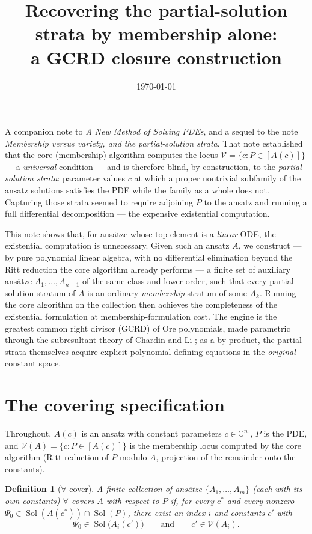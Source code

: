 \documentclass[11pt]{article}
\title{Recovering the partial-solution strata by membership alone:\\
       a GCRD closure construction}
\author{}
\date{\today}
\newcommand{\Var}{\mathcal{V}}
\DeclareMathOperator{\Sol}{Sol}
\newtheorem{definition}{Definition}
\begin{document}
\maketitle

\noindent
A companion note to \emph{A New Method of Solving PDEs}, and a sequel to the
note \emph{Membership versus variety, and the partial-solution strata}. That
note established that the core (membership) algorithm computes the locus
$\Var = \{c : P \in [A(c)]\}$ --- a \emph{universal} condition --- and is
therefore blind, by construction, to the \emph{partial-solution strata}:
parameter values $c$ at which a proper nontrivial subfamily of the ansatz
solutions satisfies the PDE while the family as a whole does not. Capturing
those strata seemed to require adjoining $P$ to the ansatz and running a full
differential decomposition --- the expensive existential computation.

This note shows that, for ans\"atze whose top element is a \emph{linear} ODE,
the existential computation is unnecessary. Given such an ansatz $A$, we
construct --- by pure polynomial linear algebra, with no differential
elimination beyond the Ritt reduction the core algorithm already performs ---
a finite set of auxiliary ans\"atze $A_1, \dots, A_{n-1}$ of the same class
and lower order, such that every partial-solution stratum of $A$ is an
ordinary \emph{membership} stratum of some $A_k$. Running the core algorithm
on the collection then achieves the completeness of the existential
formulation at membership-formulation cost. The engine is the greatest common
right divisor (GCRD) of Ore polynomials, made parametric through the
subresultant theory of Chardin and Li \cite{chardin,li}; as a by-product, the
partial strata themselves acquire explicit polynomial defining equations in
the \emph{original} constant space.

\section{The covering specification}

Throughout, $A(c)$ is an ansatz with constant parameters
$c \in \mathbb{C}^{n_c}$, $P$ is the PDE, and
$\Var(A) = \{c : P \in [A(c)]\}$ is the membership locus computed by the core
algorithm (Ritt reduction of $P$ modulo $A$, projection of the remainder onto
the constants).

\begin{definition}[$\forall$-cover]
\label{def:cover}
A finite collection of ans\"atze $\{A_1, \dots, A_m\}$ (each with its own
constants) \emph{$\forall$-covers} $A$ with respect to $P$ if, for every
$c^*$ and every nonzero
$\Psi_0 \in \Sol(A(c^*)) \cap \Sol(P)$, there exist an index $i$ and
constants $c'$ with
\[
\Psi_0 \in \Sol\big(A_i(c')\big)
\qquad\text{and}\qquad
c' \in \Var(A_i).
\]
\end{definition}
\end{document}
